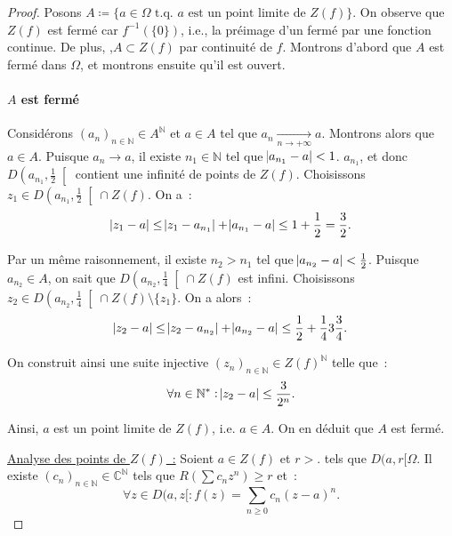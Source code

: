 \documentclass{report}
\theoremstyle{definition}
\theoremstyle{remark}
\numberwithin{equation}{section}
\newcommand{\C}{\mathbb C}
\newcommand{\N}{\mathbb N}
\newcommand{\tq}{\text{ t.q. }}
\newcommand{\pinfty}{{+\infty}}
\begin{document}
			\begin{proof} Posons $A \coloneqq \{a \in \Omega \tq a \text{ est un point limite de } Z(f)\}$. On observe que $Z(f)$ est fermé car $f^{-1}(\{0\})$, i.e.,
			la préimage d'un fermé par une fonction continue. De plus, ,$A \subset Z(f)$ par continuité de $f$. Montrons d'abord que $A$ est fermé dans $\Omega$, et
			montrons ensuite qu'il est ouvert.

			\paragraph*{$A$ est fermé} Considérons $(a_n)_{n \in \N} \in A^\N$ et $a \in A$ tel que $a_n \xrightarrow[n \to \pinfty]{} a$. Montrons alors que $a \in A$.
			Puisque $a_n \to a$, il existe $n_1 \in \N$ tel que $\abs {a_{n_1} - a} < 1$. $a_{n_1}$, et donc $D\left(a_{n_1}, \frac 12\right[$ contient une infinité de
			points de $Z(f)$. Choisissons $z_1 \in D\left(a_{n_1}, \frac 12\right[ \cap Z(f)$. On a~:
			\begin{equation}
				\abs {z_1 - a} \leq \abs {z_1 - a_{n_1}} + \abs {a_{n_1} - a} \leq 1 + \frac 12 = \frac 32.
			\end{equation}

			Par un même raisonnement, il existe $n_2 > n_1$ tel que $\abs {a_{n_2} - a} < \frac 12$. Puisque $a_{n_2} \in A$, on sait que $D\left(a_{n_2}, \frac 14\right[ \cap Z(f)$
			est infini. Choisissons $z_2 \in D\left(a_{n_2}, \frac 14\right[ \cap Z(f) \setminus \{z_1\}$. On a alors~:
			\begin{equation}
				\abs {z_2 - a} \leq \abs {z_2 - a_{n_2}} + \abs {a_{n_2} - a} \leq \frac 12 + \frac 14 3 \frac 34.
			\end{equation}

			On construit ainsi une suite injective $(z_n)_{n \in \N} \in Z(f)^\N$ telle que~:
			\begin{equation}
				\forall n \in \N^* : \abs {z_2 - a} \leq \frac 3{2^n}.
			\end{equation}

			Ainsi, $a$ est un point limite de $Z(f)$, i.e. $a \in A$. On en déduit que $A$ est fermé.

			\underline{Analyse des points de $Z(f)$~:} Soient $a \in Z(f)$ et $r > .$ tels que $D(a, r[ \Omega$. Il existe $(c_n)_{n \in \N} \in \C^\N$ tels que
			$R(\sum c_nz^n) \geq r$ et~:
			\begin{equation}
				\forall z \in D(a, z[ : f(z) = \sum_{n \geq 0}c_n(z-a)^n.
			\end{equation}


\end{proof}
\end{document}
